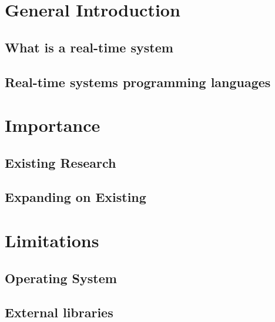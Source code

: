 









\section{General Introduction}
\subsection{What is a real-time system}
\subsection{Real-time systems programming languages}

\section{Importance} %
\subsection{Existing Research}
\subsection{Expanding on Existing}

\section{Limitations} %
\subsection{Operating System}
\subsection{External libraries}
